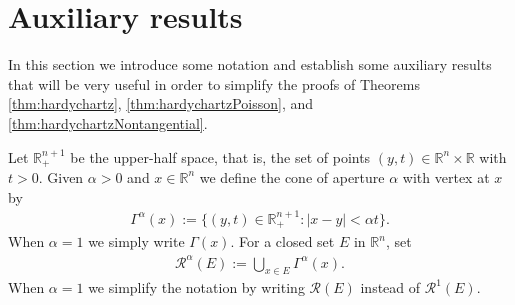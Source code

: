 \documentclass[11pt, a4paper,leqno]{amsart}
\theoremstyle{plain}
\theoremstyle{definition}
\theoremstyle{remark}
\numberwithin{equation}{section}
\def \R{ \mathbb{R} }
\begin{document}
\section{Auxiliary results}\label{section:aux}
In this section we introduce some notation and establish some auxiliary results that will be very useful in order to simplify the proofs of Theorems \ref{thm:hardychartz}, \ref{thm:hardychartzPoisson}, and \ref{thm:hardychartzNontangential}.



Let $\R_+^{n+1}$ be the upper-half space, that is, the set of points $(y,t)\in \R^n\times \R$ with $t>0$. Given $\alpha>0$ and $x\in \mathbb{R}^n$ we define the cone of aperture  $\alpha$ with vertex at $x$ by
\begin{align}\label{cone}
\Gamma^{\alpha}(x):=\{(y,t)\in \R_+^{n+1} : |x-y|<\alpha t\}.
\end{align}
When $\alpha=1$ we simply write $\Gamma(x)$. For a closed set $E$ in $\mathbb{R}^n$, set
\begin{align}\label{ralphacones}
\mathcal{R}^{\alpha}(E):=\bigcup_{x\in E}\Gamma^{\alpha}(x).
\end{align}
When $\alpha=1$ we simplify the notation by writing $\mathcal{R}(E)$ instead of $\mathcal{R}^1(E)$.
\end{document}
